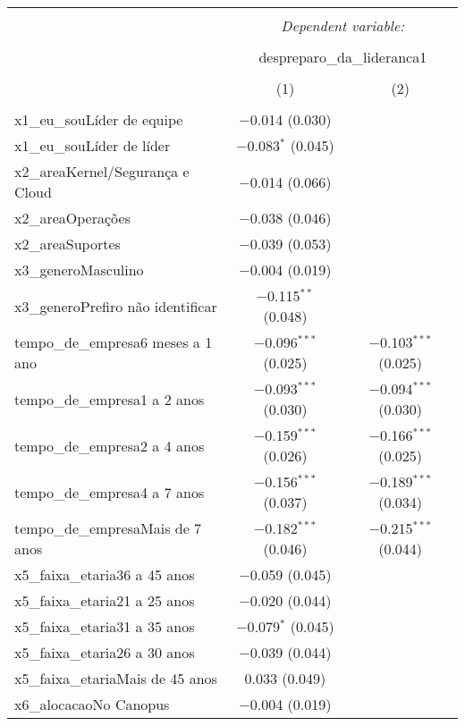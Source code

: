 \documentclass[]{book}
\begin{document}
\begin{table}[!htbp] \centering 
  \caption{} 
  \label{} 
\begin{tabular}{@{\extracolsep{5pt}}lcc} 
\\[-1.8ex]\hline 
\hline \\[-1.8ex] 
 & \multicolumn{2}{c}{\textit{Dependent variable:}} \\ 
\cline{2-3} 
\\[-1.8ex] & \multicolumn{2}{c}{despreparo\_da\_lideranca1} \\ 
\\[-1.8ex] & (1) & (2)\\ 
\hline \\[-1.8ex] 
 x1\_eu\_souLíder de equipe & $-$0.014 (0.030) &  \\ 
  x1\_eu\_souLíder de líder & $-$0.083$^{*}$ (0.045) &  \\ 
  x2\_areaKernel/Segurança e Cloud & $-$0.014 (0.066) &  \\ 
  x2\_areaOperações & $-$0.038 (0.046) &  \\ 
  x2\_areaSuportes & $-$0.039 (0.053) &  \\ 
  x3\_generoMasculino & $-$0.004 (0.019) &  \\ 
  x3\_generoPrefiro não identificar & $-$0.115$^{**}$ (0.048) &  \\ 
  tempo\_de\_empresa6 meses a 1 ano & $-$0.096$^{***}$ (0.025) & $-$0.103$^{***}$ (0.025) \\ 
  tempo\_de\_empresa1 a 2 anos & $-$0.093$^{***}$ (0.030) & $-$0.094$^{***}$ (0.030) \\ 
  tempo\_de\_empresa2 a 4 anos & $-$0.159$^{***}$ (0.026) & $-$0.166$^{***}$ (0.025) \\ 
  tempo\_de\_empresa4 a 7 anos & $-$0.156$^{***}$ (0.037) & $-$0.189$^{***}$ (0.034) \\ 
  tempo\_de\_empresaMais de 7 anos & $-$0.182$^{***}$ (0.046) & $-$0.215$^{***}$ (0.044) \\ 
  x5\_faixa\_etaria36 a 45 anos & $-$0.059 (0.045) &  \\ 
  x5\_faixa\_etaria21 a 25 anos & $-$0.020 (0.044) &  \\ 
  x5\_faixa\_etaria31 a 35 anos & $-$0.079$^{*}$ (0.045) &  \\ 
  x5\_faixa\_etaria26 a 30 anos & $-$0.039 (0.044) &  \\ 
  x5\_faixa\_etariaMais de 45 anos & 0.033 (0.049) &  \\ 
  x6\_alocacaoNo Canopus & $-$0.004 (0.019) &  \\ 

\end{tabular}
\end{table}
\end{document}
